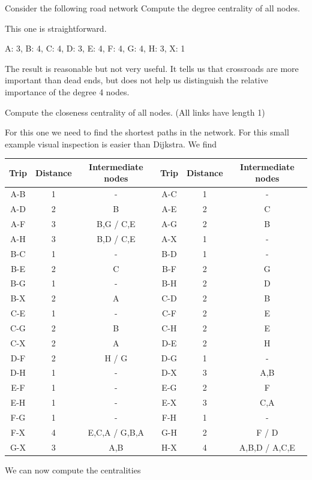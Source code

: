 
Consider the following road network
\subquestion Compute the degree centrality of all nodes.

\solution
This one is straightforward. 
\begin{center}
A: 3, B: 4, C: 4, D: 3, E: 4, F: 4, G: 4, H: 3, X: 1
\end{center}
The result is reasonable but not very useful. It tells us that crossroads are more important than dead ends, but does not help us distinguish the relative importance of the degree 4 nodes. 


\subquestion
Compute the closeness centrality of all nodes. (All links have length 1)

\solution 
For this one we need to find the shortest paths in the network. For this small example visual inspection is easier than Dijkstra. We find 
\begin{center}
\begin{tabular}{ c c c | c c c }
Trip & Distance & Intermediate nodes & Trip & Distance & Intermediate nodes \\\hline
A-B & 1 & - &
A-C & 1 & - \\
A-D & 2 & B &
A-E & 2 & C \\
A-F & 3 & B,G / C,E &
A-G & 2 & B \\
A-H & 3 & B,D / C,E &
A-X & 1 & - \\
B-C & 1 & - &
B-D & 1 & - \\
B-E & 2 & C &
B-F & 2 & G \\
B-G & 1 & - &
B-H & 2 & D \\
B-X & 2 & A &
C-D & 2 & B \\
C-E & 1 & - &
C-F & 2 & E \\
C-G & 2 & B &
C-H & 2 & E \\
C-X & 2 & A &
D-E & 2 & H \\
D-F & 2 & H / G &
D-G & 1 & - \\
D-H & 1 & - &
D-X & 3 & A,B \\
E-F & 1 & - &
E-G & 2 & F \\
E-H & 1 & - &
E-X & 3 & C,A \\
F-G & 1 & - &
F-H & 1 & - \\
F-X & 4 & E,C,A / G,B,A &
G-H & 2 & F / D \\
G-X & 3 & A,B &
H-X & 4 & A,B,D / A,C,E
\end{tabular}
\end{center}
We can now compute the centralities
